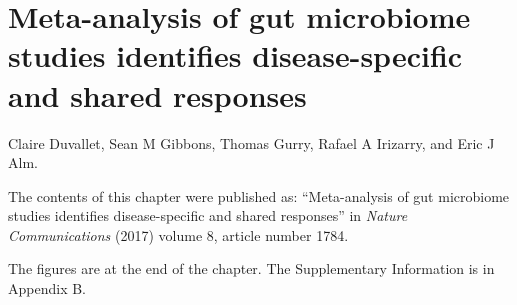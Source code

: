 
\graphicspath{{meta-analysis/figures/}}

\chapter{Meta-analysis of gut microbiome studies identifies disease-specific and shared responses}

Claire Duvallet, Sean M Gibbons, Thomas Gurry, Rafael A Irizarry, and Eric J Alm.

\bigskip
\bigskip
\noindent
The contents of this chapter were published as: ``Meta-analysis of gut microbiome studies identifies disease-specific and shared responses'' in \textit{Nature Communications} (2017) volume 8, article number 1784.

\bigskip
\bigskip
\noindent
The figures are at the end of the chapter. The Supplementary Information is in Appendix B.

\clearpage


